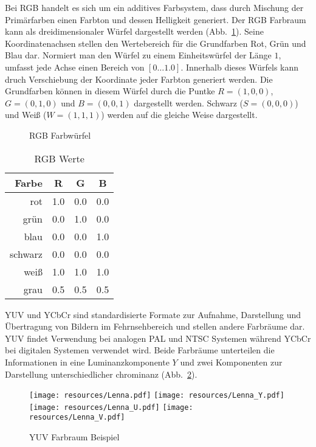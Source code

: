 Bei RGB handelt es sich um ein additives Farbsystem, dass durch Mischung der Primärfarben einen Farbton und dessen Helligkeit generiert. Der RGB Farbraum kann als dreidimensionaler Würfel dargestellt werden (Abb.~\ref{fig:rgbWuerfel}). Seine Koordinatenachsen stellen den Wertebereich für die Grundfarben Rot, Grün und Blau dar. Normiert man den Würfel zu einem Einheitswürfel der Länge $1$, umfasst jede Achse einen Bereich von \(\left[0 \dotsc 1.0\right]\). Innerhalb dieses Würfels kann druch Verschiebung der Koordinate jeder Farbton generiert werden. Die Grundfarben können in diesem Würfel durch die Puntke $R = \left(1,0,0\right)$, $G = \left(0,1,0\right)$ und $B = \left(0,0,1\right)$ dargestellt werden. Schwarz ($S = \left(0,0,0\right)$) und Weiß ($W = \left(1,1,1\right)$) werden auf die gleiche Weise dargestellt.

\begin{figure}[!ht]
	\centering
	\def\svgwidth{.2\columnwidth}
	
	\caption{RGB Farbwürfel}
	\label{fig:rgbWuerfel}
\end{figure}

\begin{table}[!ht]
	\begin{center}
	\begin{tabular}[]{r|c|c|c}
	Farbe & R & G & B \\ \hline\hline
	rot & 1.0 & 0.0 & 0.0 \\
	grün & 0.0 & 1.0 & 0.0 \\
	blau & 0.0 & 0.0 & 1.0 \\
	schwarz & 0.0 & 0.0 & 0.0 \\
	weiß & 1.0 & 1.0 & 1.0 \\
	grau & 0.5 & 0.5 & 0.5 \\
	\end{tabular}
	\caption{RGB Werte}
 	\label{tbl:rgbwerte}
	\end{center}
\end{table}

YUV und YCbCr sind standardisierte Formate zur Aufnahme, Darstellung und Übertragung von Bildern im Fehrnsehbereich und
stellen andere Farbräume dar. YUV findet Verwendung bei analogen PAL und NTSC Systemen während YCbCr bei digitalen
Systemen verwendet wird. Beide Farbräume unterteilen die Informationen in eine Luminanzkomponente $Y$ und zwei
Komponenten zur Darstellung unterschiedlicher \gls{chrominanz} (Abb.~\ref{fig:yuvLenna}).

\begin{figure}[!ht]
	\centering
	\texttt{[image: resources/Lenna.pdf]}
	\texttt{[image: resources/Lenna\_Y.pdf]}
	\texttt{[image: resources/Lenna\_U.pdf]}
	\texttt{[image: resources/Lenna\_V.pdf]}
	\caption{YUV Farbraum Beispiel}
	\label{fig:yuvLenna}
\end{figure}

